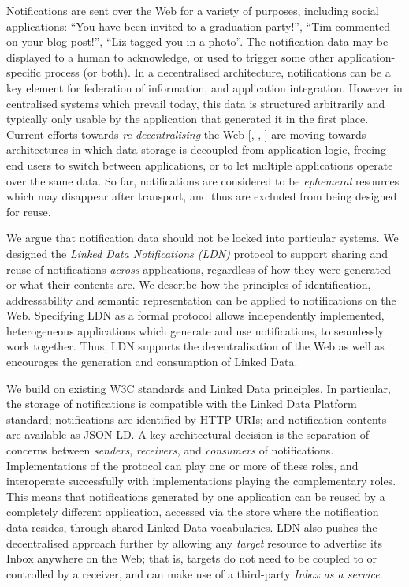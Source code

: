 \documentclass[a4paper]{llncs}
\begin{document}
                        
							
\par Notifications are sent over the Web for a variety of purposes, including social applications: ``You have been invited to a graduation party!'', ``Tim commented on your blog post!'', ``Liz tagged you in a photo''. The notification data may be displayed to a human to acknowledge, or used to trigger some other application-specific process (or both). In a decentralised architecture, notifications can be a key element for federation of information, and application integration. However in centralised systems which prevail today, this data is structured arbitrarily and typically only usable by the application that generated it in the first place. Current efforts towards {\em re-decentralising} the Web [, , ] are moving towards architectures in which data storage is decoupled from application logic, freeing end users to switch between applications, or to let multiple applications operate over the same data. So far, notifications are considered to be {\em ephemeral} resources which may disappear after transport, and thus are excluded from being designed for reuse.

                            
\par We argue that notification data should not be locked into particular systems. We designed the {\em Linked Data Notifications (LDN)} protocol to support sharing and reuse of notifications {\em across} applications, regardless of how they were generated or what their contents are. We describe how the principles of identification, addressability and semantic representation can be applied to notifications on the Web. Specifying LDN as a formal protocol allows independently implemented, heterogeneous applications which generate and use notifications, to seamlessly work together. Thus, LDN supports the decentralisation of the Web as well as encourages the generation and consumption of Linked Data.

                            
\par We build on existing W3C standards and Linked Data principles. In particular, the storage of notifications is compatible with the Linked Data Platform standard; notifications are identified by HTTP URIs; and notification contents are available as JSON-LD. A key architectural decision is the separation of concerns between {\em senders}, {\em receivers}, and {\em consumers} of notifications. Implementations of the protocol can play one or more of these roles, and interoperate successfully with implementations playing the complementary roles. This means that notifications generated by one application can be reused by a completely different application, accessed via the store where the notification data resides, through shared Linked Data vocabularies. LDN also pushes the decentralised approach further by allowing any {\em target} resource to advertise its Inbox anywhere on the Web; that is, targets do not need to be coupled to or controlled by a receiver, and can make use of a third-party {\em Inbox as a service}.
\end{document}
